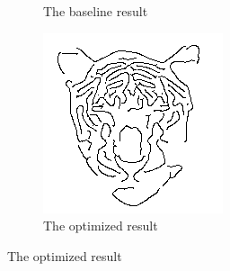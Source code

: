 \documentclass[10pt,final,journal]{IEEEtran}
\begin{document}
\begin{figure}[h!]
\begin{subfigure}[b]{0.3\textwidth}
            \caption{The baseline result}
            \label{fig:app_tiger_baseline}
    \end{subfigure}
    \begin{subfigure}[b]{0.3\textwidth}
            \includegraphics[width=\textwidth]{tiger_out}
            \caption{The optimized result}
            \label{fig:app_tiger_out}
    \end{subfigure}
  

\end{figure}
\end{document}

